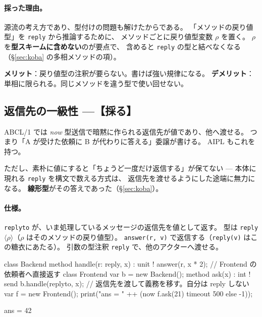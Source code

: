 \documentclass[11pt,a4paper]{ltjsarticle}
\theoremstyle{definition}
\theoremstyle{remark}
\begin{document}

\paragraph{採った理由。}
源流の考え方であり、型付けの問題も解けたからである。
「メソッドの戻り値型」を \texttt{reply} から推論するために、
メソッドごとに戻り値型変数 $\rho$ を置く。
$\rho$ を\textbf{型スキームに含めない}のが要点で、
含めると \texttt{reply} の型と結べなくなる（\S\ref{sec:koba} の多相メソッドの項）。

\textbf{メリット}：戻り値型の注釈が要らない。書けば強い規律になる。
\textbf{デメリット}：単相に限られる。同じメソッドを違う型で使い回せない。

\subsection{返信先の一級性 ---【採る】}
\label{sec:reply1st}

ABCL/1 では \emph{now} 型送信で暗黙に作られる返信先が値であり、他へ渡せる。
つまり「A が受けた依頼に B が代わりに答える」委譲が書ける。
AIPL もこれを持つ。

ただし、素朴に値にすると「ちょうど一度だけ返信する」が保てない ---
本体に現れる \texttt{reply} を構文で数える方式は、
返信先を渡せるようにした途端に無力になる。
\textbf{線形型}がその答えであった（\S\ref{sec:koba}）。

\paragraph{仕様。}
\texttt{replyto} が、いま処理しているメッセージの返信先を値として返す。
型は \texttt{reply}$\langle\rho\rangle$（$\rho$ はそのメソッドの戻り値型）。
\texttt{answer(r, v)} で返信する（\texttt{reply(v)} はこの糖衣にあたる）。
引数の型注釈 \texttt{reply} で、他のアクターへ渡せる。

\begin{aipl}
class Backend {
  method handle(r: reply, x) : unit !{} {
    answer(r, x * 2);            // Frontend の依頼者へ直接返す
  }
}
class Frontend {
  var b = new Backend();
  method ask(x) : int !{} {
    send b.handle(replyto, x);   // 返信先を渡して義務を移す。自分は reply しない
  }
}
var f = new Frontend();
print("ans = " ++ (now f.ask(21) timeout 500 else -1));
\end{aipl}
\begin{term}
ans = 42
\end{term}
\end{document}

